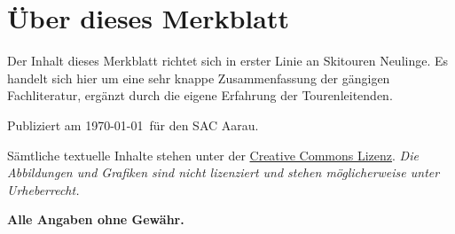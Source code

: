 \section*{Über dieses Merkblatt}

Der Inhalt dieses Merkblatt richtet sich in erster Linie an Skitouren Neulinge.
Es handelt sich hier um eine sehr knappe Zusammenfassung der gängigen Fachliteratur, ergänzt durch die eigene Erfahrung der Tourenleitenden.

Publiziert am \today\ für den SAC Aarau.

Sämtliche textuelle Inhalte stehen unter der \href{https://creativecommons.org/licenses/by/4.0/deed.de}{Creative Commons Lizenz}.
\textit{Die Abbildungen und Grafiken sind nicht lizenziert und stehen möglicherweise unter Urheberrecht.}

\textbf{Alle Angaben ohne Gewähr.}
